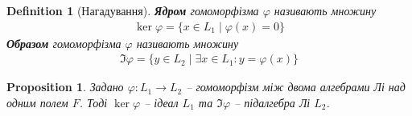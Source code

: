 \documentclass[a4paper, 10pt]{article}
\theoremstyle{theoremdd}
\newtheorem{definition}[theorem]{Definition}
\newtheorem{proposition}[theorem]{Proposition}
\begin{document}
\begin{definition}[Нагадування]
\textbf{Ядром} гомоморфізма $\varphi$ називають множину
\begin{align*}
\ker \varphi = \{x \in L_1 \mid \varphi(x) = 0\}
\end{align*}
\textbf{Образом} гомоморфізма $\varphi$ називають множину
\begin{align*}
\Im \varphi = \{y \in L_2 \mid \exists x \in L_1: y = \varphi(x)\}
\end{align*}
\end{definition}

\begin{proposition}
Задано $\varphi \colon L_1 \to L_2$ -- гомоморфізм між двома алгебрами Лі над одним полем $F$. Тоді $\ker \varphi$ -- ідеал $L_1$ та $\Im \varphi$ -- підалгебра Лі $L_2$.
\end{proposition}
\end{document}
